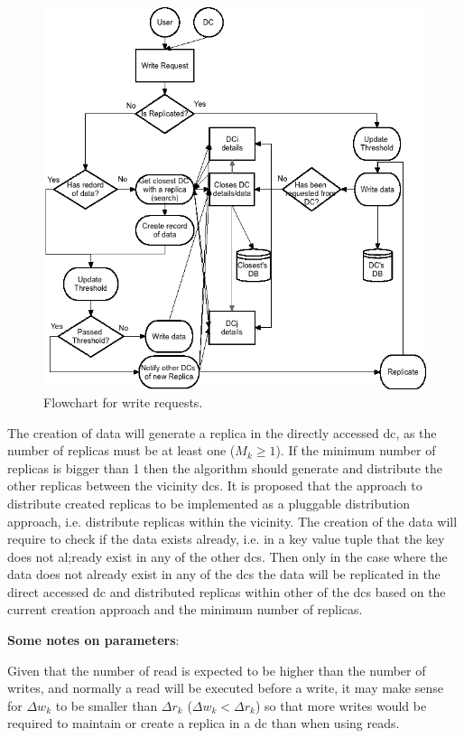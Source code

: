 \documentclass[english]{article}
\begin{document}
\begin{figure}[ht!]
	\includegraphics[width=1\textwidth]{figures/writeRequestFlowchart.png}
	
	\caption{Flowchart for write requests.}
	\label{fig:write_flowchart}
\end{figure}

The creation of data will generate a replica in the directly accessed \gls{dc}, as the number of replicas must be at least one ($M_{k} \ge 1$). If the minimum number of replicas is bigger than 1 then the algorithm should generate and distribute the other replicas between the vicinity \glspl{dc}. It is proposed that the approach to distribute created replicas to be implemented as a pluggable distribution approach, i.e. distribute replicas within the vicinity. The creation of the data will require to check if the data exists already, i.e. in a key value tuple that the key does not al;ready exist in any of the other \glspl{dc}. Then only in the case where the data does not already exist in any of the \glspl{dc} the data will be replicated in the direct accessed \gls{dc} and distributed replicas within other of the \glspl{dc} based on the current creation approach and the minimum number of replicas.


{\bf Some notes on parameters}: 

Given that the number of read is expected to be higher than the number of writes, and normally a read will be executed before a write, it may make sense for $\Delta w_{k}$ to be smaller than $\Delta r_{k}$ ($\Delta w_{k} < \Delta r_{k}$) so that more writes would be required to maintain or create a replica in a \gls{dc} than when using reads.
\end{document}
